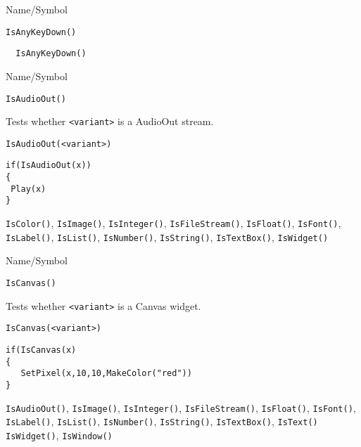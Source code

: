 \begin{desc}{Name/Symbol}
\item[Name/Symbol]	\verb+IsAnyKeyDown()+

\item[Description]	

\item[Usage]		
\begin{verbatim}
  IsAnyKeyDown()
\end{verbatim}

\item[Example]	

\item[See Also]	
\end{desc}

\begin{desc}{Name/Symbol}
\item[Name/Symbol]	\verb+IsAudioOut()+

\item[Description]	Tests whether \verb+<variant>+ is a AudioOut stream.

\item[Usage]
\begin{verbatim}
IsAudioOut(<variant>)
\end{verbatim}

\item[Example]
\begin{verbatim}
if(IsAudioOut(x))
{
 Play(x)
}
\end{verbatim}

\item[See Also] \verb+IsColor()+, \verb+IsImage()+,
  \verb+IsInteger()+, \verb+IsFileStream()+, \verb+IsFloat()+,
  \verb+IsFont()+, \verb+IsLabel()+, \verb+IsList()+,
  \verb+IsNumber()+, \verb+IsString()+, \verb+IsTextBox()+,
  \verb+IsWidget()+
\end{desc}
\begin{desc}{Name/Symbol}
\item[Name/Symbol]	\verb+IsCanvas()+

\item[Description]	Tests whether \verb+<variant>+ is a Canvas widget.

\item[Usage]
\begin{verbatim}
IsCanvas(<variant>)
\end{verbatim}

\item[Example]
\begin{verbatim}
if(IsCanvas(x)
{
   SetPixel(x,10,10,MakeColor("red"))
}
\end{verbatim}

\item[See Also] \verb+IsAudioOut()+, \verb+IsImage()+,
  \verb+IsInteger()+, \verb+IsFileStream()+, \verb+IsFloat()+,
  \verb+IsFont()+, \verb+IsLabel()+, \verb+IsList()+,
  \verb+IsNumber()+, \verb+IsString()+, \verb+IsTextBox()+, \verb+IsText()+
  \verb+IsWidget()+, \verb+IsWindow()+
\end{desc}



